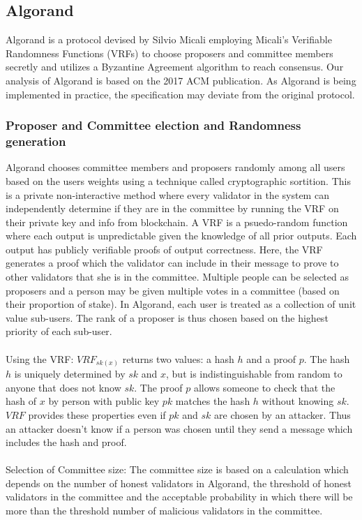 \documentclass[10pt,journal,compsoc]{IEEEtran}
\begin{document}
\subsection{Algorand}
Algorand \cite{Gilad} is a protocol devised by Silvio Micali employing Micali's Verifiable Randomness Functions (VRFs) to choose proposers and committee members secretly and utilizes a Byzantine Agreement algorithm to reach consensus. Our analysis of Algorand is based on the 2017 ACM publication. As Algorand is being implemented in practice, the specification may deviate from the original protocol.

\subsubsection{Proposer and Committee election and Randomness generation}
Algorand chooses committee members and proposers randomly among all users based on the users\’ weights using a technique called cryptographic sortition. This is a private non-interactive method where every validator in the system can independently determine if they are in the committee by running the VRF on their private key and info from blockchain. A VRF is a psuedo-random function where each output is unpredictable given the knowledge of all prior outputs. Each output has publicly verifiable proofs of output correctness. Here, the VRF generates a proof which the validator can include in their message to prove to other validators that she is in the committee. Multiple people can be selected as proposers and a person may be given multiple votes in a committee (based on their proportion of stake). In Algorand, each user is treated as a collection of unit value sub-users. The rank of a proposer is thus chosen based on the highest priority of each sub-user.
\\\\
Using the VRF: $VRF_{sk(x)}$ returns two values: a hash $h$ and a proof $p$. The hash $h$ is uniquely determined by $sk$ and $x$, but is indistinguishable from random to anyone that does not know $sk$. The proof $p$ allows someone to check that the hash of $x$ by person with public key $pk$ matches the hash $h$ without knowing $sk$. $VRF$ provides these properties even if $pk$ and $sk$ are chosen by an attacker. Thus an attacker doesn't know if a person was chosen until they send a message which includes the hash and proof. 
\\\\
Selection of Committee size: The committee size is based on a calculation which depends on the number of honest validators in Algorand, the threshold of honest validators in the committee and the acceptable probability in which there will be more than the threshold number of malicious validators in the committee. 
\end{document}
